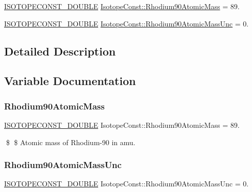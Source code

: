 \begin{DoxyCompactItemize}
\item 
\mbox{\hyperlink{group___isotope_const-_macros_ga8f45a7272ce02c0b4c65c44636ed719a}{I\+S\+O\+T\+O\+P\+E\+C\+O\+N\+S\+T\+\_\+\+D\+O\+U\+B\+LE}} \mbox{\hyperlink{group___isotope_const-_rhodium-_rh90_gab19434fc030a2e41924359bf9f68794b}{Isotope\+Const\+::\+Rhodium90\+Atomic\+Mass}} = 89.
\item 
\mbox{\hyperlink{group___isotope_const-_macros_ga8f45a7272ce02c0b4c65c44636ed719a}{I\+S\+O\+T\+O\+P\+E\+C\+O\+N\+S\+T\+\_\+\+D\+O\+U\+B\+LE}} \mbox{\hyperlink{group___isotope_const-_rhodium-_rh90_ga74a4db82f712a393234efb52ca8ee1ce}{Isotope\+Const\+::\+Rhodium90\+Atomic\+Mass\+Unc}} = 0.
\end{DoxyCompactItemize}


\subsection{Detailed Description}


\subsection{Variable Documentation}
\mbox{\label{group___isotope_const-_rhodium-_rh90_gab19434fc030a2e41924359bf9f68794b}} 
\subsubsection{\texorpdfstring{Rhodium90\+Atomic\+Mass}{Rhodium90AtomicMass}}
{\footnotesize\ttfamily \mbox{\hyperlink{group___isotope_const-_macros_ga8f45a7272ce02c0b4c65c44636ed719a}{I\+S\+O\+T\+O\+P\+E\+C\+O\+N\+S\+T\+\_\+\+D\+O\+U\+B\+LE}} Isotope\+Const\+::\+Rhodium90\+Atomic\+Mass = 89.}

\$ \$ Atomic mass of Rhodium-\/90 in amu. \mbox{\label{group___isotope_const-_rhodium-_rh90_ga74a4db82f712a393234efb52ca8ee1ce}} 
\subsubsection{\texorpdfstring{Rhodium90\+Atomic\+Mass\+Unc}{Rhodium90AtomicMassUnc}}
{\footnotesize\ttfamily \mbox{\hyperlink{group___isotope_const-_macros_ga8f45a7272ce02c0b4c65c44636ed719a}{I\+S\+O\+T\+O\+P\+E\+C\+O\+N\+S\+T\+\_\+\+D\+O\+U\+B\+LE}} Isotope\+Const\+::\+Rhodium90\+Atomic\+Mass\+Unc = 0.}

